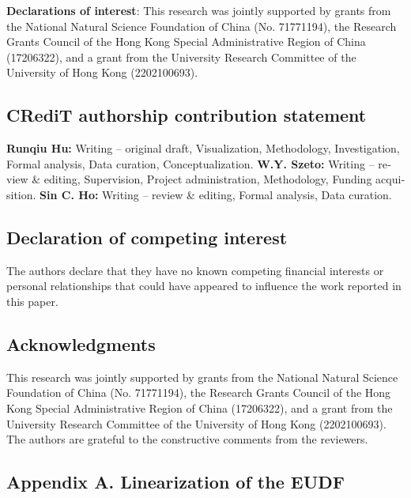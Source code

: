 \documentclass[
  english,
]{article}
\begin{document}
\begin{otherlanguage}{english}
\protect{}\label{p0710}
\textbf{Declarations of interest}: This research was jointly supported by grants from the National
Natural Science Foundation of China (No. 71771194), the Research Grants Council of the Hong Kong
Special Administrative Region of China (17206322), and a grant from the University Research
Committee of the University of Hong Kong (2202100693).

\protect{}\label{s0140}
\subsection{CRediT authorship contribution statement}\label{st160}

\protect{}\label{p0720}
\textbf{Runqiu Hu:} Writing -- original draft, Visualization, Methodology, Investigation, Formal
analysis, Data curation, Conceptualization. \textbf{W.Y. Szeto:} Writing -- review \& editing,
Supervision, Project administration, Methodology, Funding acquisition. \textbf{Sin C. Ho:} Writing
-- review \& editing, Formal analysis, Data curation.

\protect{}\label{coi005}
\subsection{Declaration of competing interest}\label{st165}

\protect{}\label{p0725}
The authors declare that they have no known competing financial interests or personal relationships
that could have appeared to influence the work reported in this paper.

\protect{}\label{ak005}
\subsection{Acknowledgments}\label{st170}

\protect{}\label{p0730}
This research was jointly supported by grants from the National Natural Science Foundation of China
(No. 71771194), the Research Grants Council of the Hong Kong Special Administrative Region of China
(17206322), and a grant from the University Research Committee of the University of Hong Kong
(2202100693). The authors are grateful to the constructive comments from the reviewers.

\protect{}\label{s0145}
\subsection{Appendix A. Linearization of the EUDF}\label{st175}


\end{otherlanguage}
\end{document}
